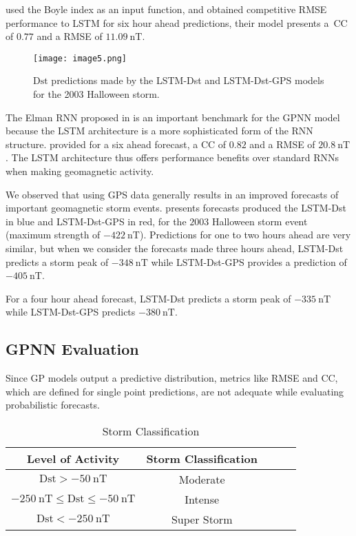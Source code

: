 \citet{Bala2012} used the Boyle index as an input function, and obtained competitive RMSE performance to LSTM for 
six hour ahead predictions, their model presents a\ CC of $0.77$ and a RMSE of $\SI{11.09}{\nano\tesla}$.
%
\begin{figure}
	\texttt{[image: image5.png]}
	\caption{$\mathrm{Dst}$ predictions made by the LSTM-Dst and LSTM-Dst-GPS models for the 2003 Halloween storm.}
    \label{fig:lstmhalloween}
\end{figure}
%
The Elman RNN proposed in \citet{wu1997geomagnetic} is an important benchmark for the GPNN model because the 
LSTM architecture is a more sophisticated form of the RNN structure. \citet{wu1997geomagnetic} provided for a 
six ahead forecast, a CC of $0.82$ and a RMSE of $\SI{20.8}{\nano\tesla}$. The LSTM architecture thus offers 
performance benefits over standard RNNs when making geomagnetic activity.
 
We observed that using GPS data generally results in an improved forecasts of important geomagnetic storm events. 
 presents forecasts produced the LSTM-Dst in blue and LSTM-Dst-GPS in red, 
for the $2003$ Halloween storm event (maximum strength of $\SI{-422}{\nano\tesla}$). Predictions for one to two hours 
ahead are very similar, but when we consider the forecasts made three hours ahead, LSTM-Dst predicts a storm peak 
of $\SI{-348}{\nano\tesla}$ while LSTM-Dst-GPS provides a prediction of $\SI{-405}{\nano\tesla}$. 

For a four hour ahead forecast, LSTM-Dst predicts a storm peak of $\SI{-335}{\nano\tesla}$ while LSTM-Dst-GPS predicts 
$\SI{-380}{\nano\tesla}$.



\subsection{GPNN Evaluation}

Since GP models output a predictive distribution, metrics like RMSE and CC, which are defined for single point 
predictions, are not adequate while evaluating probabilistic forecasts.

\begin{table}[ht]
	\centering
	\caption{Storm Classification}
	\label{table:stormclass}
	\begin{tabular}{ccccc}
	\hline
	\textbf{Level of Activity} & \textbf{Storm Classification} \\ \hline
	$\mathrm{Dst} > \SI{-50}{\nano\tesla}$ & Moderate\\
	$\SI{-250}{\nano\tesla} \leq \mathrm{Dst} \leq \SI{-50}{\nano\tesla}$ & Intense\\
	$\mathrm{Dst} < \SI{-250}{\nano\tesla}$ & Super Storm\\ \hline
	\end{tabular}
\end{table}

